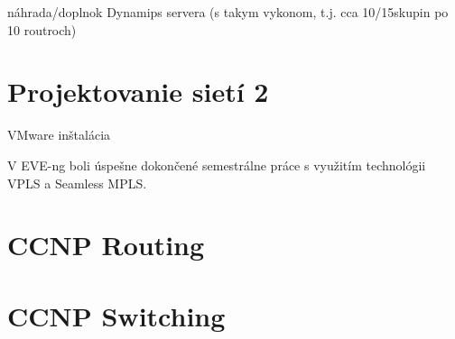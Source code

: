 náhrada/doplnok Dynamips servera (s takym vykonom, t.j. cca 10/15skupin po 10 routroch)




\section{Projektovanie sietí 2}

VMware inštalácia

V EVE-ng boli úspešne dokončené semestrálne práce s využitím technológii VPLS a Seamless MPLS.

\section{CCNP Routing}

\section{CCNP Switching}